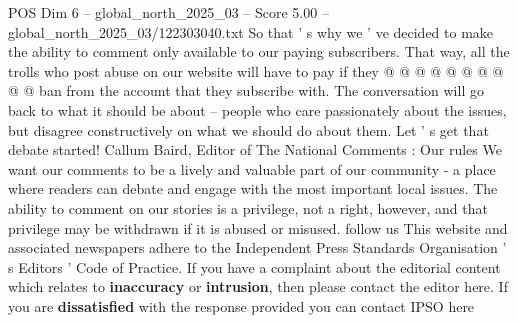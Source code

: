 \begin{textsample}{POS Dim 6 – global\_north\_2025\_03 – Score 5.00 – global\_north\_2025\_03/122303040.txt}
So that ' s why we ' ve decided to make the ability to comment only available to our paying subscribers.
That way, all the trolls who post abuse on our website will have to pay if they @ @ @ @ @ @ @ @ @ @ ban from the account that they subscribe with.
The conversation will go back to what it should be about -- people who care passionately about the issues, but disagree constructively on what we should do about them.
Let ' s get that debate started!
Callum Baird, Editor of The National Comments : Our rules We want our comments to be a lively and valuable part of our community - a place where readers can debate and engage with the most important local issues.
The ability to comment on our stories is a privilege, not a right, however, and that privilege may be withdrawn if it is abused or misused. follow us This website and associated newspapers adhere to the Independent Press Standards Organisation ' s Editors ' Code of Practice.
If you have a complaint about the editorial content which relates to \textbf{inaccuracy} or \textbf{intrusion}, then please contact the editor here.
If you are \textbf{dissatisfied} with the response provided you can contact IPSO here

\end{textsample}

